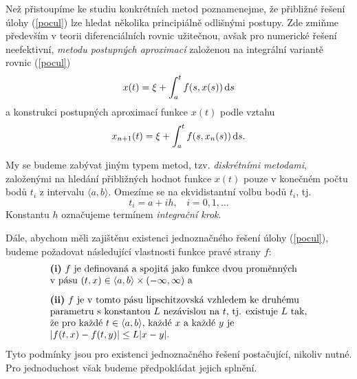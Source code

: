 \documentclass[a4paper, 12pt]{book}
\theoremstyle{definition}
\def\d{\,{\rm d}}               %
\begin{document}
Než přistoupíme ke studiu konkrétních metod poznamenejme, 
že přibližné řešení úlohy (\ref{pocul}) lze hledat několika principiálně
odlišnými postupy. Zde zmiňme především v teorii diferenciálních rovnic 
užitečnou, avšak pro numerické řešení neefektivní, {\em metodu postupných
aproximací} založenou na integrální variantě rovnic (\ref{pocul})
\begin{displaymath}
x(t)=\xi + \int_a^t f(s,x(s))\d s
\end{displaymath}
a konstrukci postupných aproximací funkce $x(t)$ podle vztahu
\begin{displaymath}
x_{n+1}(t)=\xi + \int_a^t f(s,x_n(s))\d s.
\end{displaymath}

My se budeme zabývat jiným typem metod, tzv. {\em diskrétními 
metodami}, založenými na hledání přibližných hodnot funkce $x(t)$ pouze
v konečném počtu bodů $t_i$ z intervalu $\langle a,b\rangle$. Omezíme 
se na ekvidistantní volbu bodů $t_i$, tj.
\begin{displaymath}
t_i=a+ih,~~~~ i=0,1,\dots
\end{displaymath}
Konstantu $h$ označujeme termínem {\em integrační krok}.

Dále, abychom měli zajištěnu existenci jednoznačného řešení úlohy (\ref{pocul}),
budeme požadovat následující vlastnosti funkce pravé strany $f$:
\begin{equation}\label{predpokl}
\begin{array}{l}
\begin{array}{l}\mbox{{\bf (i)} $f$ je definovaná a spojitá jako funkce dvou proměnných}\\ 
\mbox{v pásu $(t,x)\in\langle a,b\rangle\times (-\infty,\infty)$ a}\end{array}\\[5mm]
\begin{array}{l}\mbox{{\bf (ii)} $f$ je v tomto pásu lipschitzovská vzhledem ke druhému}\\
\mbox{parametru s konstantou $L$ nezávislou na $t$, tj. existuje $L$ tak,}\\
\mbox{že pro každé $t\in\langle a,b \rangle$, každé $x$ a každé $y$ je}\\ 
\mbox{$|f(t,x)-f(t,y)|\leq L|x-y|$.}\end{array}
\end{array}
\end{equation}
Tyto podmínky jsou pro existenci jednoznačného řešení postačující, 
nikoliv nutné. Pro jednoduchost však budeme předpokládat jejich splnění.
\end{document}
